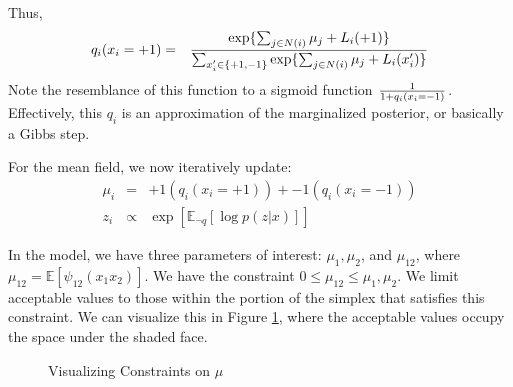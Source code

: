 \documentclass[twoside]{article}
\begin{document}
Thus, 
\begin{eqnarray*}
q_i(x_i=+1) &=& { \exp\{ \sum_{j \in N(i)} \mu_j + L_i(+1) \}   \over \sum_{x_i^{\prime} \in \{ +1, -1\}} \exp \{ \sum_{j \in N(i)} \mu_j + L_i(x_i^{\prime}) \} }
\end{eqnarray*}
Note the resemblance of this function to a sigmoid function $1 \over 1+q_i(x_i=-1)$. Effectively, this $q_i$ is an approximation of the marginalized posterior, or basically a Gibbs step.

For the mean field, we now iteratively update:
\begin{eqnarray*}
\mu_i &=& +1 (q_i(x_i=+1)) + -1 (q_i(x_i=-1)) \\
z_i &\propto& \exp[ \mathbb{E}_{\neg q}[ \log p(z|x)]]
\end{eqnarray*}

In the model, we have three parameters of interest: $\mu_1, \mu_2$, and $\mu_{12}$, where $\mu_{12}=\mathbb{E}[\psi_{12}(x_1 x_2)]$. We have the constraint $0 \leq \mu_{12} \leq \mu_1, \mu_2$. We limit acceptable values to those within the portion of the simplex that satisfies this constraint. We can visualize this in Figure \ref{mu}, where the acceptable values occupy the space under the shaded face. 

\begin{figure}[H]
\begin{center}
\setlength{\fboxsep}{0pt}
\setlength{\fboxrule}{1pt}
\caption{Visualizing Constraints on $\mu$}
\label{mu}
\end{center}
\end{figure}
\end{document}
